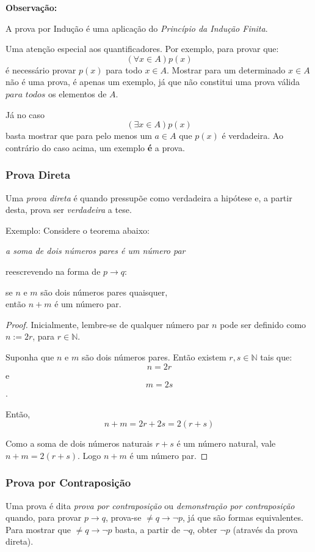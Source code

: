\documentclass[oneside,a4paper,12pt]{article}
\newtheorem{proof}{Demonstração}
\begin{document}
\textbf{Observação:}

A prova por Indução é uma aplicação do {\it Princípio da Indução Finita}.

Uma atenção especial aos quantificadores. Por exemplo, para provar que: $$(\forall x \in A)p(x)$$ é necessário provar $p(x)$ para todo $x \in A$. Mostrar para um determinado $x \in A$  não é uma prova, é apenas um exemplo, já que não constitui uma prova válida $para$ $todos$ os elementos de $A$.

Já no caso $$(\exists x \in A)p(x)$$ basta mostrar que para pelo menos um $a \in A$ que $p(x)$ é verdadeira. Ao contrário do caso acima, um exemplo {\bf é} a prova.


\subsubsection{Prova Direta}

Uma {\it prova direta} é quando pressupõe como verdadeira a hipótese e, a partir desta, prova ser {\it verdadeira} a tese.

Exemplo:
Considere o teorema abaixo:
\begin{center}
	{\it a soma de dois números pares é um número par}
\end{center}

reescrevendo na forma de $p \rightarrow q$:
\begin{center}
	se $n$ e $m$ são dois números pares quaisquer,\\ então $n+m$ é um número par.
\end{center}

\begin{proof}
	Inicialmente, lembre-se de qualquer número par $n$ pode ser definido como $n:=2r$, para $r \in \mathbb{N}$.
	
	Suponha que $n$ e $m$ são dois números pares. Então existem $r,s \in \mathbb{N}$ tais que: 
	$$ n = 2r$$ e $$m=2s$$.
	
	Então,
	$$n+m=2r+2s=2(r+s)$$
	
	Como a soma de dois números naturais $r+s$ é um número natural, vale $n+m = 2(r+s)$. Logo $n+m$ é um número par.
\end{proof}


\subsubsection{Prova por Contraposição}

Uma prova é dita {\it prova por contraposição} ou {\it demonstração por contraposição} quando, para provar $p \rightarrow q$, prova-se $\neq q \rightarrow \neg p$, já que são formas equivalentes. Para mostrar que $\neq q \rightarrow \neg p$ basta, a partir de $\neg q$, obter $\neg p$ (através da prova direta).
\end{document}

